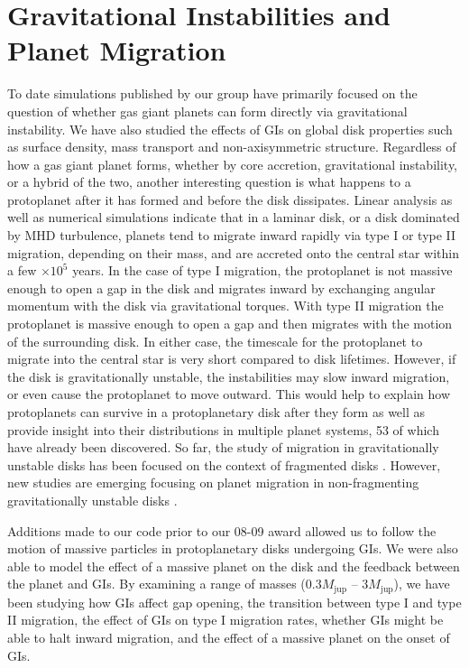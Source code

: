 \documentclass[12pt,preprint2]{aastex}
\begin{document}
\section{Gravitational Instabilities and\\ Planet Migration}
\label{sec:migration}

To date simulations published by our group have primarily focused on the question of whether gas giant planets can form
directly via gravitational instability. We have also studied the effects of GIs on global disk properties such as
surface density, mass transport and non-axisymmetric structure. Regardless of how a gas giant planet forms, whether by
core accretion, gravitational instability, or a hybrid of the two, another interesting question is what happens to a
protoplanet after it has formed and before the disk dissipates.  Linear analysis \citep{ward1997,tanaka2002} as well as
numerical simulations \citep{nelson2003,nelson2004} indicate that in a laminar disk, or a disk dominated by MHD
turbulence, planets tend to migrate inward rapidly via type I or type II migration, depending on their mass, and are
accreted onto the central star within a few $\times 10^5$ years. In the case of type I migration, the protoplanet is not
massive enough to open a gap in the disk and migrates inward by exchanging angular momentum with the disk via
gravitational torques. With type II migration the protoplanet is massive enough to open a gap and then migrates with the
motion of the surrounding disk. In either case, the timescale for the protoplanet to migrate into the central star is
very short compared to disk lifetimes. However, if the disk is gravitationally unstable, the instabilities may slow
inward migration, or even cause the protoplanet to move outward. This would help to explain how protoplanets can survive
in a protoplanetary disk after they form as well as provide insight into their distributions in multiple planet systems,
53 of which have already been discovered. So far, the study of migration in gravitationally unstable disks has been
focused on the context of fragmented disks \citep{mayer2004,boss2005}. However, new studies are emerging focusing on
planet migration in non-fragmenting gravitationally unstable disks \citep{michael2011b, baruteau2011}.

Additions made to our code prior to our 08-09 award allowed us to follow the motion of massive particles in
protoplanetary disks undergoing GIs. We were also able to model the effect of a massive planet on the disk and the
feedback between the planet and GIs. By examining a range of masses ($0.3 M_{\mathrm{jup}}$ -- $3 M_{\mathrm{jup}}$), we
have been studying how GIs affect gap opening, the transition between type I and type II migration, the effect of GIs on
type I migration rates, whether GIs might be able to halt inward migration, and the effect of a massive planet on the
onset of GIs.
\end{document}
